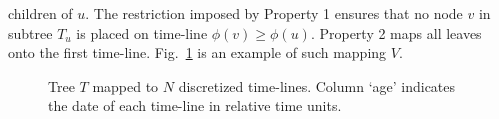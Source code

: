 \documentclass{llncs}
\newcommand{\ejmcomment}[1]{{\color{green} #1}}
\begin{document}
children of $u$.
%
The restriction imposed by Property 1 ensures that no node $v$ in subtree $T_u$
is placed on time-line $\phi(v) \geq \phi(u)$. Property 2 maps all leaves onto
the first time-line. Fig.~\ref{fig:mapping} is an example of such mapping $V$.
%
%
\begin{figure}[t]
\centering
\scalebox{0.3}{
}
\caption{Tree $T$ mapped to $N$ discretized time-lines. Column `age' indicates
the date of each time-line in relative time units.}
\label{fig:mapping}
\end{figure}
%
\end{document}

